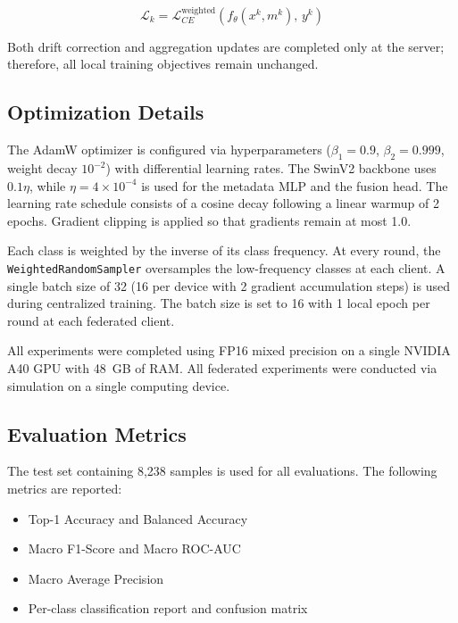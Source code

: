 \documentclass{ieeeaccess}
\begin{document}
\begin{equation}
\label{eq:local_loss}
\mathcal{L}_k = \mathcal{L}_{CE}^{\text{weighted}}(f_{\theta}(x^k, m^k),\, y^k)
\end{equation}

Both drift correction and aggregation updates are completed only at the server; therefore, all local training objectives remain unchanged.

\subsection{Optimization Details}

The AdamW optimizer is configured via hyperparameters ($\beta_1=0.9$, $\beta_2=0.999$, weight decay $10^{-2}$) with differential learning rates. The SwinV2 backbone uses $0.1\eta$, while $\eta = 4 \times 10^{-4}$ is used for the metadata MLP and the fusion head. The learning rate schedule consists of a cosine decay following a linear warmup of 2 epochs. Gradient clipping is applied so that gradients remain at most 1.0.

Each class is weighted by the inverse of its class frequency. At every round, the \texttt{WeightedRandomSampler} oversamples the low-frequency classes at each client. A single batch size of 32 (16 per device with 2 gradient accumulation steps) is used during centralized training. The batch size is set to 16 with 1 local epoch per round at each federated client.

All experiments were completed using FP16 mixed precision on a single NVIDIA A40 GPU with 48~GB of RAM. All federated experiments were conducted via simulation on a single computing device.

\subsection{Evaluation Metrics}

The test set containing 8,238 samples is used for all evaluations. The following metrics are reported:
\begin{itemize}
    \item Top-1 Accuracy and Balanced Accuracy
    \item Macro F1-Score and Macro ROC-AUC
    \item Macro Average Precision
    \item Per-class classification report and confusion matrix
\end{itemize}
\end{document}
